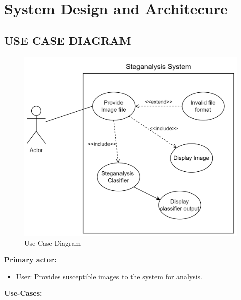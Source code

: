\chapter{System Design and Architecure}
\section{USE CASE DIAGRAM}
\begin{figure}[H]
    \centering
    \includegraphics[width=120mm]{./img/useCase.png}
    \caption{Use Case Diagram}
\end{figure}
\large{\textbf{Primary actor:}}
\begin{itemize}[noitemsep]
    \item User: Provides susceptible images to the system for analysis.
\end{itemize}
\begin{flushleft}
\large{\textbf{Use-Cases:}}
\end{flushleft}
\clearpage
